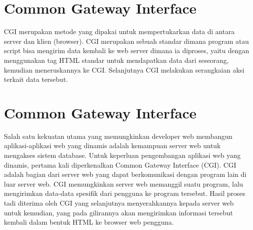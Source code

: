 
\section{Common Gateway Interface}
CGI merupakan metode yang dipakai untuk mempertukarkan data di antara server dan klien (browser). CGI merupakan sebuah standar dimana program atau script bisa mengirim data kembali ke web server dimana ia diproses, yaitu dengan menggunakan tag HTML standar untuk mendapatkan data dari seseorang, kemudian meneruskannya ke CGI. Selanjutnya CGI melakukan serangkaian aksi terkait data tersebut\cite{prihatmoko2013pengembangan}.

\section{Common Gateway Interface}
Salah satu kekuatan utama yang memungkinkan developer web membangun aplikasi-aplikasi web yang dinamis adalah kemampuan server web untuk mengakses sistem database. Untuk keperluan pengembangan aplikasi web yang dinamis, pertama kali diperkenalkan Common Gateway Interface (CGI). CGI adalah bagian dari server web yang dapat berkomunikasi dengan program lain di luar server web. CGI memungkinkan server web memanggil suatu program, lalu mengirimkan data-data spesifik dari pengguna ke program tersebut. Hasil proses tadi diterima oleh CGI yang selanjutnya menyerahkannya kepada server web untuk kemudian, yang pada gilirannya akan mengirimkan informasi tersebut kembali dalam bentuk HTML ke browser web pengguna.


